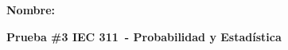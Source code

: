 \documentclass[a4paper,addpoints,answers,11pt]{exam}
\newcommand{\course}{IEC 311}
\newcommand{\coursename}{Probabilidad y Estadística}
\begin{document}
\begin{flushleft}
\textbf{Nombre:}\ \hrulefill
\end{flushleft}
\begin{center}
\textbf{Prueba \#3 \course\ - \coursename}
\end{center}
\begin{questions}




\end{questions}
\begin{center}
\addpoints
\gradetable[v]
\end{center}
\end{document}
